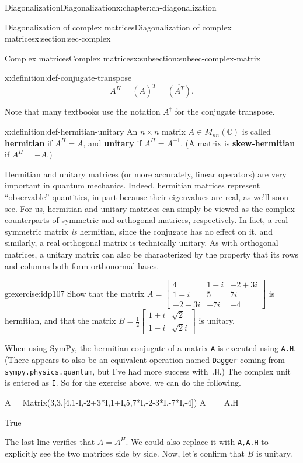 \documentclass[oneside,10pt,]{book}
\newcommand{\mono}[1]{\texttt{#1}}
\newcommand{\terminology}[1]{\textbf{#1}}
\numberwithin{equation}{section}
\newcommand{\bbm}{\begin{bmatrix}}
\newcommand{\ebm}{\end{bmatrix}}
\newcommand{\C}{\mathbb{C}}
\newcommand{\amp}{&}
\begin{document}
\begin{chapterptx}{Diagonalization}{}{Diagonalization}{}{}{x:chapter:ch-diagonalization}
\begin{sectionptx}{Diagonalization of complex matrices}{}{Diagonalization of complex matrices}{}{}{x:section:sec-complex}
\begin{subsectionptx}{Complex matrices}{}{Complex matrices}{}{}{x:subsection:subsec-complex-matrix}
\begin{definition}{}{x:definition:def-conjugate-transpose}
\begin{equation*}
A^H = (\bar{A})^T=\overline{(A^T)}\text{.}
\end{equation*}
%
\end{definition}
Note that many textbooks use the notation \(A^\dagger\) for the conjugate transpose.%
\begin{definition}{}{x:definition:def-hermitian-unitary}%
An \(n\times n\) matrix \(A\in M_{nn}(\C)\) is called \terminology{hermitian} if \(A^H = A\), and \terminology{unitary} if \(A^H = A^{-1}\). (A matrix is \terminology{skew-hermitian} if \(A^H=-A\).)%
\end{definition}
Hermitian and unitary matrices (or more accurately, linear operators) are very important in quantum mechanics. Indeed, hermitian matrices represent ``observable'' quantities, in part because their eigenvalues are real, as we'll soon see. For us, hermitian and unitary matrices can simply be viewed as the complex counterparts of symmetric and orthogonal matrices, respectively. In fact, a real symmetric matrix \emph{is} hermitian, since the conjugate has no effect on it, and similarly, a real orthogonal matrix is technically unitary. As with orthogonal matrices, a unitary matrix can also be characterized by the property that its rows and columns both form orthonormal bases.%
\begin{inlineexercise}{}{g:exercise:idp107}%
Show that the matrix \(A = \bbm 4\amp 1-i\amp -2+3i\\1+i\amp 5 \amp 7i\\-2-3i\amp -7i\amp -4\ebm\) is hermitian, and that the matrix \(B = \frac12\bbm 1+i\amp \sqrt{2}\\1-i\amp\sqrt{2}i\ebm\) is unitary.%
\end{inlineexercise}%
When using SymPy, the hermitian conjugate of a matrix \mono{A} is executed using \mono{A.H}. (There appears to also be an equivalent operation named \mono{Dagger} coming from \mono{sympy.physics.quantum}, but I've had more success with \mono{.H}.) The complex unit is entered as \mono{I}. So for the exercise above, we can do the following.%
\begin{sageinput}
A = Matrix(3,3,[4,1-I,-2+3*I,1+I,5,7*I,-2-3*I,-7*I,-4])
A == A.H
\end{sageinput}
\begin{sageoutput}
True
\end{sageoutput}
The last line verifies that \(A=A^H\). We could also replace it with \mono{A,A.H} to explicitly see the two matrices side by side. Now, let's confirm that \(B\) is unitary.%
\begin{sageinput}

\end{sageinput}
\end{subsectionptx}
\end{sectionptx}
\end{chapterptx}
\end{document}
